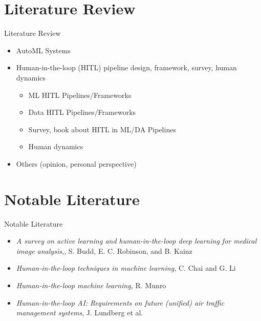 \documentclass{beamer}
\begin{document}
\section{Literature Review}
\begin{frame}{Literature Review}
\begin{itemize}
    \item AutoML Systems \cite{shang2019democratizing} \cite{elshawi2019automated} \cite{patel2020smart}
    \item Human-in-the-loop (HITL) pipeline design, framework, survey, human dynamics
        \begin{itemize}
            \item ML HITL Pipelines/Frameworks \cite{van2021towards} \cite{chai2020humanoutlier} \cite{xin2018accelerating} \cite{xin2018helix}
            \item Data HITL Pipelines/Frameworks \cite{li2017human}
            \item Survey, book about HITL in ML/DA Pipelines \cite{xanthopoulos2020putting} \cite{budd2021survey} \cite{chai2020human} \cite{Munro2020human}
            \item Human dynamics \cite{honeycutt2020soliciting}
        \end{itemize}
    \item Others (opinion, personal perspective) \cite{zanzotto2019human} \cite{bezrukavnikov2021neophyte}
\end{itemize}
\end{frame}


\section{Notable Literature}
\begin{frame}{Notable Literature}
\begin{itemize}
    \item <1-> \textit{A survey on active learning and human-in-the-loop deep learning for medical image analysis,}, S. Budd, E. C. Robinson, and B. Kainz
    \item <2-> \textit{Human-in-the-loop techniques in machine learning,} C. Chai and G. Li
    \item <3-> \textit{Human-in-the-loop machine learning,} R. Munro
    \item <4-> \textit{Human-in-the-loop AI:  Requirements on future (unified) air traffic management systems}, J. Lundberg et al.
\end{itemize}
\end{frame}
\end{document}

